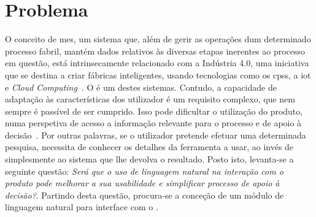 \section{Problema}
\label{sec:chap01_problem}
O conceito de \gls{mes}, um sistema que, além de gerir as operações dum determinado processo fabril, mantém dados relativos às diversas etapas inerentes ao processo em questão, está intrinsecamente relacionado com a Indústria 4.0, uma iniciativa que se destina a criar fábricas inteligentes, usando tecnologias como os \glspl{cps}, a \gls{iot} e \textit{Cloud Computing}~\parencite{intelligent_manufacturing_context_industry40_review}. O {\productname} é um destes sistemas. Contudo, a capacidade de adaptação às características dos utilizador é um requisito complexo, que nem sempre é passível de ser cumprido. Isso pode dificultar o utilização do produto, numa perspetiva de acesso a informação relevante para o processo e de apoio à decisão~\parencite{intelligent_manufacturing_context_industry40_review}. Por outras palavras, se o utilizador pretende efetuar uma determinada pesquisa, necessita de conhecer os detalhes da ferramenta a usar, ao invés de simplesmente  ao sistema que lhe devolva o resultado. Posto isto, levanta-se a seguinte questão: \textit{Será que o uso de linguagem natural na interação com o produto pode melhorar a sua usabilidade e simplificar processo de apoio à decisão?}. Partindo desta questão, 
procura-se a conceção de um módulo de linguagem natural para interface com o {\productname}.






